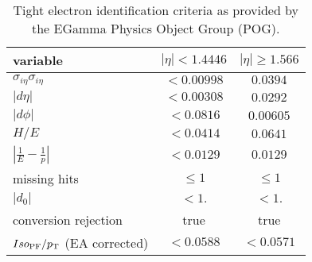\begin{table}[ht]
    \centering
    \setlength{\tabcolsep}{2em}
    \renewcommand{\arraystretch}{1.25}
    \caption{Tight electron identification criteria as provided by the EGamma Physics Object Group (POG).}
    \label{tab:analysis:selection:electron_id}

    \begin{tabular}{l|c|c}
        \hline
        variable                          & $|\eta| < 1.4446$ & $|\eta| \geq 1.566$ \\
        \hline
        $\sigma_{i\eta}\sigma_{i\eta}$    & $<0.00998$        & $0.0394$            \\
        $|d\eta|$                         & $<0.00308$        & $0.0292$            \\
        $|d\phi|$                         & $<0.0816$         & $0.00605$           \\
        $H/E$                             & $<0.0414$         & $0.0641$            \\
        $|\frac{1}{E} - \frac{1}{p}|$     & $<0.0129$         & $0.0129$            \\
        missing hits                      & $\leq 1$          & $\leq 1$            \\
        $|d_{0}|$                         & $<1.$             & $<1.$               \\
        \hline
        conversion rejection              & true              & true                \\
        $Iso_\mathrm{PF}/p_{\mathrm{T}}$ (EA corrected) & $< 0.0588$        & $<0.0571$           \\
        \hline
    \end{tabular}
\end{table}